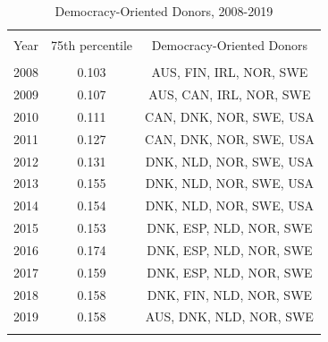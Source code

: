 
\begin{table}[!htbp] \centering 
  \caption{Democracy-Oriented Donors, 2008-2019} 
  \label{app:tab_dnrorient} 
\begin{tabular}{@{\extracolsep{5pt}} ccc} 
\\[-1.8ex]\hline 
\hline \\[-1.8ex] 
Year & 75th percentile & Democracy-Oriented Donors \\ 
\hline \\[-1.8ex] 
2008 & 0.103 & AUS, FIN, IRL, NOR, SWE \\ 
2009 & 0.107 & AUS, CAN, IRL, NOR, SWE \\ 
2010 & 0.111 & CAN, DNK, NOR, SWE, USA \\ 
2011 & 0.127 & CAN, DNK, NOR, SWE, USA \\ 
2012 & 0.131 & DNK, NLD, NOR, SWE, USA \\ 
2013 & 0.155 & DNK, NLD, NOR, SWE, USA \\ 
2014 & 0.154 & DNK, NLD, NOR, SWE, USA \\ 
2015 & 0.153 & DNK, ESP, NLD, NOR, SWE \\ 
2016 & 0.174 & DNK, ESP, NLD, NOR, SWE \\ 
2017 & 0.159 & DNK, ESP, NLD, NOR, SWE \\ 
2018 & 0.158 & DNK, FIN, NLD, NOR, SWE \\ 
2019 & 0.158 & AUS, DNK, NLD, NOR, SWE \\ 
\hline \\[-1.8ex] 
\end{tabular} 
\end{table} 
